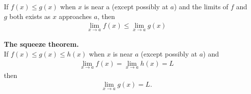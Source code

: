 \documentclass{article}
\begin{document}
\begin{theorem}
	If $f(x) \leq g(x)$ when $x$ is near a (except possibly at $a$) and the limits of $f$ and $g$ both exists as $x$ approaches $a$, then
	\begin{align*}
		\lim_{x\to a}f(x) \leq \lim_{x\to a} g(x)
	\end{align*}
\end{theorem}
\begin{theorem}
	\textbf{The squeeze theorem.}\\
	If $f(x)\leq g(x)\leq h(x)$ when $x$ is near $a$ (except possibly at $a$) and
	\begin{align*}
		\lim_{x\to a}f(x) = \lim_{x\to a}h(x) = L
	\end{align*}
	then
	\begin{align*}
		\lim_{x \to a}g(x) = L.
	\end{align*}
\end{theorem}
\end{document}
